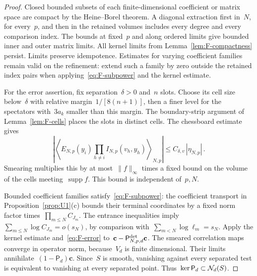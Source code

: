 \begin{proof}
Closed bounded subsets of each finite-dimensional coefficient or matrix space are compact by the Heine--Borel theorem. A diagonal extraction first in~$N$, for every~$p$, and then in the retained volumes includes every degree and every comparison index. The bounds at fixed~$p$ and along ordered limits give bounded inner and outer matrix limits. All kernel limits from Lemma~\ref{lem:F-compactness} persist. Limits preserve idempotence. Estimates for varying coefficient families remain valid on the refinement: extend such a family by zero outside the retained index pairs when applying~\eqref{eq:F-subpower} and the kernel estimate.

For the error assertion, fix separation~$\delta>0$ and~$n$ slots. Choose its cell size below~$\delta$ with relative margin~$1/[8(n+1)]$, then a finer level for the spectators with~$3a_k$ smaller than this margin. The boundary-strip argument of Lemma~\ref{lem:F-cells} places the slots in distinct cells. The chessboard estimate gives
\begin{equation}\label{eq:F-error}
\left|\left\langle E_{N,p}(y_i)\prod_{h\ne i}I_{N,p}(v_h,y_h)\right\rangle_{N,p}\right|\le C_{\delta,v}\,|\eta_{N,p}|\,.
\end{equation}
Smearing multiplies this by at most~$\|f\|_\infty$ times a fixed bound on the volume of the cells meeting~$\operatorname{supp}f$. This bound is independent of~$p,N$.

Bounded coefficient families satisfy~\eqref{eq:F-subpower}: the coefficient transport in Proposition~\ref{prop:U1}(c) bounds their terminal coordinates by a fixed norm factor times~$\prod_{m\le N}C_{J_m}$. The entrance inequalities imply~$\sum_{m\le N}\log C_{J_m}=o(s_N)$, by comparison with~$\sum_{m<N}\log\ell_m=s_N$. Apply the kernel estimate and~\eqref{eq:F-error} to~$\mathbf c-\mathsf P^{\rm det}_{N,p,d}\mathbf c$. The smeared correlation maps converge in operator norm, because~$V_d$ is finite dimensional. Their limits annihilate~$(1-\mathsf P_d)\mathbf c$. Since~$S$ is smooth, vanishing against every separated test is equivalent to vanishing at every separated point. Thus~$\ker\mathsf P_d\subset\mathcal{N}_{d}(S)$.


\end{proof}
